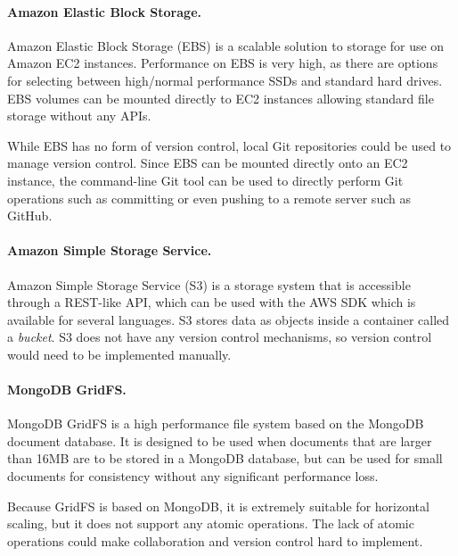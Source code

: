 \documentclass[a4paper, 12pt]{article}
\begin{document}

\paragraph{Amazon Elastic Block Storage.}
Amazon Elastic Block Storage (EBS) is a scalable solution to storage for use on Amazon EC2 instances. Performance on EBS is very high, as there are options for selecting between high/normal performance SSDs and standard hard drives. EBS volumes can be mounted directly to EC2 instances allowing standard file storage without any APIs.


While EBS has no form of version control, local Git repositories could be used to manage version control. Since EBS can be mounted directly onto an EC2 instance, the command-line Git tool can be used to directly perform Git operations such as committing or even pushing to a remote server such as GitHub.


\paragraph{Amazon Simple Storage Service.}
Amazon Simple Storage Service (S3) is a storage system that is accessible through a REST-like API, which can be used with the AWS SDK which is available for several languages. S3 stores data as objects inside a container called a \emph{bucket}. S3 does not have any version control mechanisms, so version control would need to be implemented manually.


\paragraph{MongoDB GridFS.}
MongoDB GridFS is a high performance file system based on the MongoDB document database. It is designed to be used when documents that are larger than 16MB are to be stored in a MongoDB database, but can be used for small documents for consistency without any significant performance loss. 


Because GridFS is based on MongoDB, it is extremely suitable for horizontal scaling, but it does not support any atomic operations. The lack of atomic operations could make collaboration and version control hard to implement.
\end{document}

